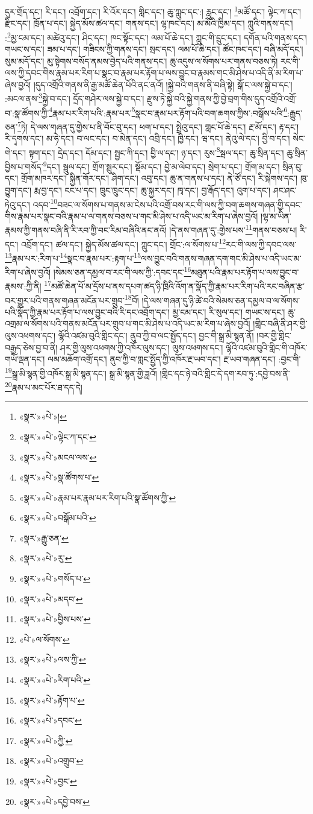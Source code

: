 དུར་གྲོད་དང་། རི་དང་། འབྲོག་དང་། རི་འོར་དང་། གླིང་དང་། ཆུ་ཀླུང་དང་:། རླུང་དང་། \footnote{«སྣར་»«པེ་»།  }མཚོ་དང་། ལྟེང་ཀ་དང་། རྫིང་དང་། ཁྲོན་པ་དང་། སྐྱེད་མོས་ཚལ་དང་། གནས་དང་། ལྷ་ཁང་དང་། མ་མོའི་ཁྱིམ་དང་། ཀླུའི་གནས་དང་། :\footnote{«སྣར་»«པེ་»ལྟེང་ཀ་དང་}མྱ་ངམ་དང་། མཚེའུ་དང་། ཤིང་དང་། ཁང་སྟོང་དང་། ལམ་པོ་ཆེ་དང་། ཀླུང་གི་དྲུང་དང་། དགོན་པའི་གནས་དང་། གཡང་ས་དང་། ཟམ་པ་དང་། གཟིངས་ཀྱི་གནས་དང་། སྲང་དང་། ལམ་པོ་ཆེ་དང་། ཚོང་ཁང་དང་། བཞི་མདོ་དང་། སུམ་མདོ་དང་། མུ་སྟེགས་བསོད་ནམས་བྱེད་པའི་གནས་དང་། ཆུ་འདུས་ལ་སོགས་པར་གནས་བཅས་ཏེ། རང་གི་ལས་ཀྱི་དབང་གིས་རྣམ་པར་རིག་པ་སྣང་བ་རྣམ་པར་རྟོག་པ་ལས་བྱུང་བ་རྣམས་གང་མི་ཤེས་པ་འདི་ནི་མ་རིག་པ་ཞེས་བྱའོ། །དུད་འགྲོའི་གནས་ནི་རྒྱ་མཚོ་ཆེན་པོའི་ནང་ནའོ། །སྐྱེ་བའི་གནས་ནི་བཞི་སྟེ། སྒོ་ང་ལས་སྐྱེ་བ་དང་། :མངལ་ནས་\footnote{«སྣར་»«པེ་»མངལ་ལས་}སྐྱེ་བ་དང་། དྲོད་གཤེར་ལས་སྐྱེ་བ་དང་། རྫུས་ཏེ་སྐྱེ་བའི་སྐྱེ་གནས་ཀྱི་བྱེ་བྲག་གིས་དུད་འགྲོའི་འགྲོ་བ་:སྣ་ཚོགས་ཀྱི་\footnote{«སྣར་»«པེ་»སྣ་ཚོགས་པ་}རྣམ་པར་རིག་པའི་:རྣམ་པར་\footnote{«སྣར་»«པེ་»རྣམ་པར་རྣམ་པར་རིག་པའི་སྣ་ཚོགས་ཀྱི་}སྣང་བ་རྣམ་པར་རྟོག་པའི་བག་ཆགས་ཀྱིས་:བསྒོས་པའི་\footnote{«སྣར་»«པེ་»བསྒོམ་པའི་}:རྒྱུད་ཅན་\footnote{«སྣར་»རྒྱུ་ཅན་}ཏེ། དེ་ལས་གཞན་དུ་གྱེས་པ་ནི་བོང་བུ་དང་། ཕག་པ་དང་། སྤྲེའུ་དང་། གླང་པོ་ཆེ་དང་། རྔ་མོ་དང་། རྟ་དང་། རི་དྭགས་དང་། མ་ཧེ་དང་། བ་ལང་དང་། བ་མེན་དང་། འབྲི་དང་། ཁྱི་དང་། ཝ་དང་། ནེའུ་ལེ་དང་། བྱི་བ་དང་། སེང་གེ་དང་། སྟག་དང་། དྲེད་དང་། དོམ་དང་། སྤྱང་ཀི་དང་། བྱི་ལ་དང་། ཉ་དང་། རུས་\footnote{«སྣར་»«པེ་»རུ་}སྦལ་དང་། ཆུ་སྲིན་དང་། ཆུ་སྲིན་བྱིས་པ་གསོད་\footnote{«སྣར་»«པེ་»གསོད་པ་}དང་། སྦྲུལ་དང་། གྲོག་སྦུར་དང་། སྡོམ་དང་། བྱེ་མ་ལེབ་དང་། སྲེག་པ་དང་། གྲོག་མ་དང་། སྲིན་བུ་དང་། གྲོག་མཁར་དང་། སྐྱིན་གོར་དང་། ཤིག་དང་། འབུ་དང་། ཆུ་ན་གནས་པ་དང་། ནེ་ཙོ་དང་། རི་སྐེགས་དང་། ཁུ་བྱུག་དང་། རྨ་བྱ་དང་། ངང་པ་དང་། ཁྲུང་ཁྲུང་དང་། ཆུ་སྐྱར་དང་། ཁྭ་དང་། བྱ་རྒོད་དང་། འུག་པ་དང་། ཤང་ཤང་ཏེའུ་དང་། འདབ་\footnote{«སྣར་»«པེ་»མདབ་}བཟང་ལ་སོགས་པ་གནས་མ་ངེས་པའི་འགྲོ་བས་རང་གི་ལས་ཀྱི་བག་ཆགས་གཞན་གྱི་དབང་གིས་རྣམ་པར་སྣང་བའི་རྣམ་པ་ལ་གནས་བཅས་པ་གང་མི་ཤེས་པ་འདི་ཡང་མ་རིག་པ་ཞེས་བྱའོ། །ལྷ་མ་ཡིན་རྣམས་ཀྱི་གནས་བཞི་ནི་རི་རབ་ཀྱི་བང་རིམ་བཞིའི་ནང་ནའོ། །དེ་ནས་གཞན་དུ་:གྱེས་པས་\footnote{«སྣར་»«པེ་»བྱིས་པས་}གནས་བཅས་པ། རི་དང་། འབྲོག་དང་། ཚལ་དང་། སྐྱེད་མོས་ཚལ་དང་། ཀླུང་དང་། གྲོང་:ལ་སོགས་པ་\footnote{«པེ་»ལ་སོགས་}རང་གི་ལས་ཀྱི་དབང་ལས་\footnote{«སྣར་»«པེ་»ལས་ཀྱི་}རྣམ་པར་:རིག་པ་\footnote{«སྣར་»«པེ་»རིག་པའི་}སྣང་བ་རྣམ་པར་:རྟག་པ་\footnote{«སྣར་»«པེ་»རྟོག་པ་}ལས་བྱུང་བའི་གནས་གཞན་དག་གང་མི་ཤེས་པ་འདི་ཡང་མ་རིག་པ་ཞེས་བྱའོ། །སེམས་ཅན་དམྱལ་བ་རང་གི་ལས་ཀྱི་:དབང་དང་\footnote{«སྣར་»«པེ་»དབང་}མཐུན་པའི་རྣམ་པར་རྟོག་པ་ལས་བྱུང་བ་རྣམས་:ཀྱི་ནི། \footnote{«སྣར་»«པེ་»ཀྱི་}མཚོ་ཆེན་པོ་མ་དྲོས་པ་ནས་དཔག་ཚད་ཉི་ཁྲིའི་འོག་ན་སྣོད་ཀྱི་རྣམ་པར་རིག་པའི་རང་བཞིན་རྩ་བར་གྱུར་པའི་གནས་གཞན་མངོན་པར་གྲུབ་\footnote{«སྣར་»«པེ་»འགྲུབ་}བོ། །དེ་ལས་གཞན་དུ་ཉི་ཚེ་བའི་སེམས་ཅན་དམྱལ་བ་ལ་སོགས་པའི་སྣོད་ཀྱི་རྣམ་པར་རྟོག་པ་ལས་བྱུང་བའི་རི་དང་འབྲོག་དང་། མྱ་ངམ་དང་། རི་སུལ་དང་། གཡང་ས་དང་། ཆུ་འགྲམ་ལ་སོགས་པའི་གནས་མངོན་པར་གྲུབ་པ་གང་མི་ཤེས་པ་འདི་ཡང་མ་རིག་པ་ཞེས་བྱའོ། །གླིང་བཞི་ནི་ཤར་གྱི་ལུས་འཕགས་དང་། ལྷོའི་འཛམ་བུའི་གླིང་དང་། ནུབ་ཀྱི་བ་ལང་སྤྱོད་དང་། བྱང་གི་སྒྲ་མི་སྙན་ནོ། །བར་གྱི་གླིང་བརྒྱད་ཅེས་བྱ་བ་ནི། ཤར་གྱི་ལུས་འཕགས་ཀྱི་འཁོར་ལུས་དང་། ལུས་འཕགས་དང་། ལྷོའི་འཛམ་བུའི་གླིང་གི་འཁོར་གཡོ་ལྡན་དང་། ལམ་མཆོག་འགྲོ་དང་། ནུབ་ཀྱི་བ་གླང་སྤྱོད་ཀྱི་འཁོར་རྔ་ཡབ་དང་། རྔ་ཡབ་གཞན་དང་། :བྱང་གི་\footnote{«སྣར་»«པེ་»བྱང་}སྒྲ་མི་སྙན་གྱི་འཁོར་སྒྲ་མི་སྙན་དང་། སྒྲ་མི་སྙན་གྱི་ཟླའོ། །གླིང་དང་ཉེ་བའི་གླིང་དེ་དག་རབ་ཏུ་:དབྱེ་བས་ནི་\footnote{«སྣར་»«པེ་»དབྱེ་བས་}རྣམ་པ་མང་པོར་ཐ་དད་དེ། 